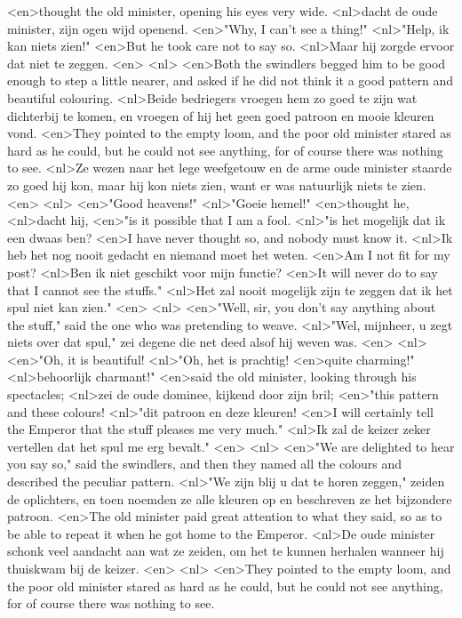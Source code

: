 <en>thought the old minister, opening his eyes very wide.
<nl>dacht de oude minister, zijn ogen wijd openend.
<en>"Why, I can't see a thing!"
<nl>"Help, ik kan niets zien!"
<en>But he took care not to say so.
<nl>Maar hij zorgde ervoor dat niet te zeggen.
<en>
<nl>
<en>Both the swindlers begged him to be good enough to step a little nearer, and asked if he did not think it a good pattern and beautiful colouring.
<nl>Beide bedriegers vroegen hem zo  goed te zijn wat dichterbij te komen, en vroegen of hij het geen goed patroon en mooie kleuren vond.
<en>They pointed to the empty loom, and the poor old minister stared as hard as he could, but he could not see anything, for of course there was nothing to see.
<nl>Ze wezen naar het lege weefgetouw en de arme oude minister staarde zo goed hij kon, maar hij kon niets zien, want er was natuurlijk niets te zien.
<en>
<nl>
<en>"Good heavens!"
<nl>"Goeie hemel!"
<en>thought he,
<nl>dacht hij,
<en>"is it possible that I am a fool.
<nl>"is het mogelijk dat ik een dwaas ben?
<en>I have never thought so, and nobody must know it.
<nl>Ik heb het nog nooit gedacht en niemand moet het weten.
<en>Am I not fit for my post?
<nl>Ben ik niet geschikt voor mijn functie?
<en>It will never do to say that I cannot see the stuffs."
<nl>Het zal nooit mogelijk zijn te zeggen dat ik het spul niet kan zien."
<en>
<nl>
<en>"Well, sir, you don't say anything about the stuff," said the one who was pretending to weave.
<nl>"Wel, mijnheer, u zegt niets over dat spul," zei degene die net deed alsof hij weven was.
<en>
<nl>
<en>"Oh, it is beautiful!
<nl>"Oh, het is prachtig!
<en>quite charming!"
<nl>behoorlijk charmant!"
<en>said the old minister, looking through his spectacles;
<nl>zei de oude dominee, kijkend door zijn bril;
<en>"this pattern and these colours!
<nl>"dit patroon en deze kleuren!
<en>I will certainly tell the Emperor that the stuff pleases me very much."
<nl>Ik zal de keizer zeker vertellen dat het spul me erg bevalt."
<en>
<nl>
<en>"We are delighted to hear you say so," said the swindlers, and then they named all the colours and described the peculiar pattern.
<nl>"We zijn blij u dat te horen zeggen," zeiden de oplichters, en toen noemden ze alle kleuren op en beschreven ze het bijzondere patroon.
<en>The old minister paid great attention to what they said, so as to be able to repeat it when he got home to the Emperor.
<nl>De oude minister schonk veel aandacht aan wat ze zeiden, om het te kunnen herhalen wanneer hij thuiskwam bij de keizer.
<en>
<nl>
<en>They pointed to the empty loom, and the poor old minister stared as hard as he could, but he could not see anything, for of course there was nothing to see.
